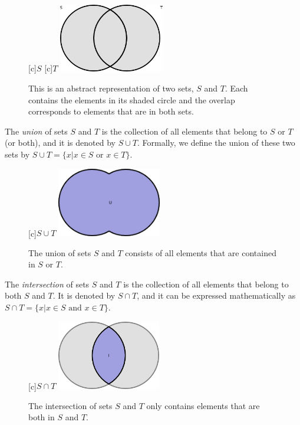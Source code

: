 \begin{figure}[htb!]
\begin{center}
\begin{psfrags}
[c]{$S$}
[c]{$T$}
\includegraphics[height=3.00cm]{Figures/1Chapter/sets}
\end{psfrags}
\caption{This is an abstract representation of two sets, $S$ and $T$.
Each contains the elements in its shaded circle and the overlap corresponds to elements that are in both sets.}
\end{center}
\end{figure}

The \emph{union} of sets $S$ and $T$ is the collection of all elements that belong to $S$ or $T$ (or both), and it is denoted by $S \cup T$.
Formally, we define the union of these two sets by $S \cup T = \{ x | x \in S \text{ or } x \in T \}$.

\begin{figure}[htb!]
\begin{center}
\begin{psfrags}
[c]{$S \cup T$}
\includegraphics[height=3.03cm]{Figures/1Chapter/union}
\end{psfrags}
\caption{The union of sets $S$ and $T$ consists of all elements that are contained in $S$ or $T$.}
\end{center}
\end{figure}

The \emph{intersection} of sets $S$ and $T$ is the collection of all elements that belong to both $S$ and $T$.
It is denoted by $S \cap T$, and it can be expressed mathematically as $S \cap T = \{ x | x \in S \text{ and } x \in T \}$.

\begin{figure}[htb!]
\begin{center}
\begin{psfrags}
[c]{$S \cap T$}
\includegraphics[height=3.03cm]{Figures/1Chapter/intersection}
\end{psfrags}
\caption{The intersection of sets $S$ and $T$ only contains elements that are both in $S$ and $T$.}
\end{center}
\end{figure}


